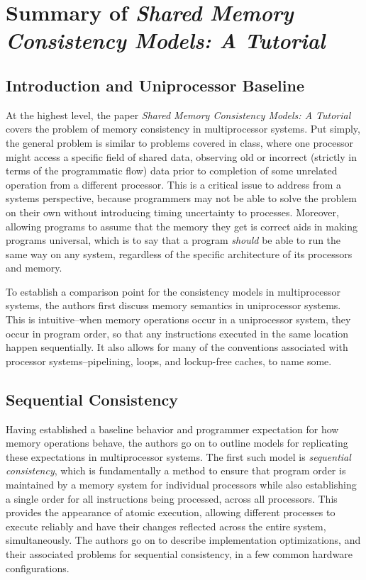 \documentclass{article}
\begin{document}
  
  \graphicspath{{./images/}}

\section{Summary of \textit{Shared Memory Consistency Models: A Tutorial}}
\subsection{Introduction and Uniprocessor Baseline}

\par At the highest level, the paper \textit{Shared Memory Consistency Models: A Tutorial} covers the problem of memory consistency in multiprocessor systems.
Put simply, the general problem is similar to problems covered in class, where one processor might access a specific field of shared data, observing old or incorrect (strictly in terms of the programmatic flow) data prior to completion of some unrelated operation from a different processor.
This is a critical issue to address from a systems perspective, because programmers may not be able to solve the problem on their own without introducing timing uncertainty to processes.
Moreover, allowing programs to assume that the memory they get is correct aids in making programs universal, which is to say that a program \textit{should} be able to run the same way on any system, regardless of the specific architecture of its processors and memory.

\par To establish a comparison point for the consistency models in multiprocessor systems, the authors first discuss memory semantics in uniprocessor systems.
This is intuitive--when memory operations occur in a uniprocessor system, they occur in program order, so that any instructions executed in the same location happen sequentially.
It also allows for many of the conventions associated with processor systems--pipelining, loops, and lockup-free caches, to name some.

\subsection{Sequential Consistency}

\par Having established a baseline behavior and programmer expectation for how memory operations behave, the authors go on to outline models for replicating these expectations in multiprocessor systems.
The first such model is \textit{sequential consistency}, which is fundamentally a method to ensure that program order is maintained by a memory system for individual processors while also establishing a single order for all instructions being processed, across all processors.
This provides the appearance of atomic execution, allowing different processes to execute reliably and have their changes reflected across the entire system, simultaneously. The authors go on to describe implementation optimizations, and their associated problems for sequential consistency, in a few common hardware configurations. 
\end{document}
